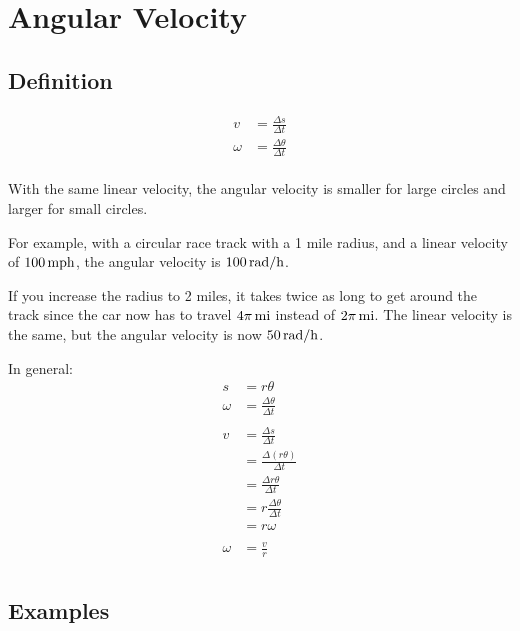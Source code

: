 \documentclass{exam}
\begin{document}
  \section{Angular Velocity}

  \subsection{Definition}

  \begin{align*}
    v      & = \frac{\Delta s}{\Delta t} \\
    \omega & = \frac{\Delta \theta}{\Delta t} \\
  \end{align*}

  With the same linear velocity, the angular velocity is smaller for large circles and larger for small circles.

  For example, with a circular race track with a 1 mile radius, and a linear velocity of $\unit[100]{mph}$, the
  angular velocity is $\unit[100]{rad/h}$.  
  
  If you increase the radius to 2 miles, it takes twice as long to get around the track since the car now has to
  travel $\unit[4 \pi]{mi}$ instead of $\unit[2 \pi]{mi}$.  The linear velocity is the same, but the angular velocity is 
  now $\unit[50]{rad/h}$.

  In general:
  \begin{align*}
    s      & = r \theta \\
    \omega & = \frac{\Delta \theta}{\Delta t} \\
    \\
    v & = \frac{\Delta s}{\Delta t} \\
      & = \frac{\Delta (r \theta)}{\Delta t} \\
      & = \frac{\Delta r \theta}{\Delta t} \\
      & = r \frac{\Delta \theta}{\Delta t} \\
      & = r \omega \\
    \\
    \omega &= \frac{v}{r} \\
  \end{align*}


  \subsection{Examples}
\end{document}
